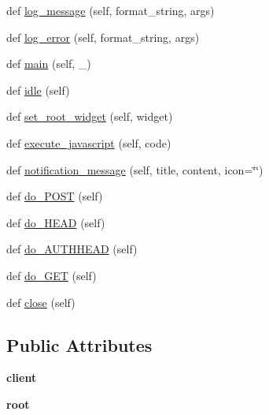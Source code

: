 \begin{DoxyCompactItemize}
\item 
def \hyperlink{classremi_1_1server_1_1App_a2be308eef6fc7edbac1f466a785f770f}{log\+\_\+message} (self, format\+\_\+string, args)
\item 
def \hyperlink{classremi_1_1server_1_1App_a71930c51a480bb92af13f98524002df2}{log\+\_\+error} (self, format\+\_\+string, args)
\item 
def \hyperlink{classremi_1_1server_1_1App_af1da9c2e11558e446e88689d24cfedc7}{main} (self, \+\_\+)
\item 
def \hyperlink{classremi_1_1server_1_1App_af1322a72bf30958f7e12d8724ef551b8}{idle} (self)
\item 
def \hyperlink{classremi_1_1server_1_1App_ab47d0fc28c3bf057b23af2fe43106540}{set\+\_\+root\+\_\+widget} (self, widget)
\item 
def \hyperlink{classremi_1_1server_1_1App_a598177e1a1f52a309c79b9e797786aa2}{execute\+\_\+javascript} (self, code)
\item 
def \hyperlink{classremi_1_1server_1_1App_a77ebb63c24ac45cc18d8bc66351528bc}{notification\+\_\+message} (self, title, content, icon=\char`\"{}\char`\"{})
\item 
def \hyperlink{classremi_1_1server_1_1App_aa34df2fe60d807ebb4c7c8cc994b5327}{do\+\_\+\+P\+O\+ST} (self)
\item 
def \hyperlink{classremi_1_1server_1_1App_a25d39a4d4f9d32edb2e5a31f1eabd83d}{do\+\_\+\+H\+E\+AD} (self)
\item 
def \hyperlink{classremi_1_1server_1_1App_acce9e9f8d8f04dd984249ccc8d1bf066}{do\+\_\+\+A\+U\+T\+H\+H\+E\+AD} (self)
\item 
def \hyperlink{classremi_1_1server_1_1App_a95e6a5444f88a19af698be2601cc7f96}{do\+\_\+\+G\+ET} (self)
\item 
def \hyperlink{classremi_1_1server_1_1App_a7cbfd6854b7c503f45a9f7313a6349f6}{close} (self)
\end{DoxyCompactItemize}
\subsection*{Public Attributes}
\begin{DoxyCompactItemize}
\item 
{\bfseries client}\hypertarget{classremi_1_1server_1_1App_a8dbd1d51665a0f2f46fd665ead4079e3}{}\label{classremi_1_1server_1_1App_a8dbd1d51665a0f2f46fd665ead4079e3}

\item 
{\bfseries root}\hypertarget{classremi_1_1server_1_1App_ac4e644aad58f70e9220d86a214eb9591}{}\label{classremi_1_1server_1_1App_ac4e644aad58f70e9220d86a214eb9591}

\end{DoxyCompactItemize}
